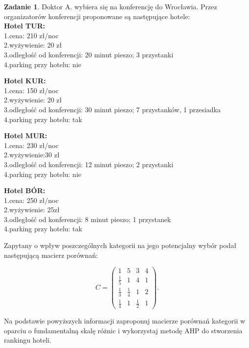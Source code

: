 \documentclass{article}[UTF8]
\theoremstyle{definition}
\newtheorem{zad}{Zadanie}
\begin{document}
\begin{zad}
Doktor A. wybiera się na konferencję do Wrocławia. Przez organizatorów konferencji proponowane są następujące hotele: \\

\textbf{Hotel TUR:}\\
1.cena: 210 zł/noc\\
2.wyżywienie: 20 zł \\
3.odległość od konferencji: 20 minut pieszo; 3 przystanki\\
4.parking przy hotelu: nie

\textbf{Hotel KUR:}\\
1.cena: 150 zł/noc\\
2.wyżywienie: 20 zł\\
3.odległość od konferencji: 30 minut pieszo; 7 przystanków, 1 przesiadka \\
4.parking przy hotelu: tak

\textbf{Hotel MUR:}\\
1.cena: 230 zł/noc\\
2.wyżywienie:30 zł\\
3.odległość od konferencji: 12 minut pieszo; 2 przystanki\\
4.parking przy hotelu: nie

\textbf{Hotel BÓR:}\\
1.cena: 250 zł/noc\\
2.wyżywienie: 25zł\\
3.odległość od konferencji: 8 minut pieszo; 1 przystanek\\
4.parking przy hotelu: tak

Zapytany o wpływ poszczególnych kategorii na jego potencjalny wybór podał następującą macierz porównań:

$$C=\begin{pmatrix}
1&5&3&4\\
\frac{1}{5}&1&4&1\\
\frac{1}{3}&\frac{1}{4}&1&2\\
\frac{1}{4}&1&\frac{1}{2}&1
\end{pmatrix}.
$$


Na podstawie powyższych informacji zaproponuj macierze porównań kategorii w oparciu o fundamentalną skalę różnic i wykorzystaj metodę AHP do stworzenia rankingu hoteli.

\end{zad}

\newpage
\end{document}
